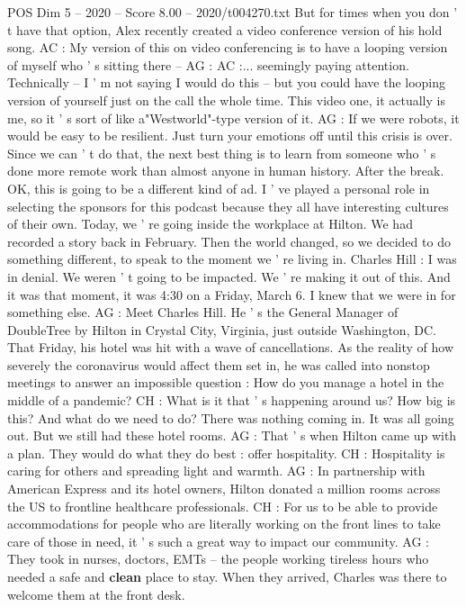 \begin{textsample}{POS Dim 5 – 2020 – Score 8.00 – 2020/t004270.txt}
But for times when you don ' t have that option, Alex recently created a video conference version of his hold song.
AC : My version of this on video conferencing is to have a looping version of myself who ' s sitting there -- AG : AC :... seemingly paying attention.
Technically -- I ' m not saying I would do this -- but you could have the looping version of yourself just on the call the whole time.
This video one, it actually is me, so it ' s sort of like a"Westworld"-type version of it.
AG : If we were robots, it would be easy to be resilient.
Just turn your emotions off until this crisis is over.
Since we can ' t do that, the next best thing is to learn from someone who ' s done more remote work than almost anyone in human history.
After the break.
OK, this is going to be a different kind of ad.
I ' ve played a personal role in selecting the sponsors for this podcast because they all have interesting cultures of their own.
Today, we ' re going inside the workplace at Hilton.
We had recorded a story back in February.
Then the world changed, so we decided to do something different, to speak to the moment we ' re living in.
Charles Hill : I was in denial.
We weren ' t going to be impacted.
We ' re making it out of this.
And it was that moment, it was 4:30 on a Friday, March 6.
I knew that we were in for something else.
AG : Meet Charles Hill.
He ' s the General Manager of DoubleTree by Hilton in Crystal City, Virginia, just outside Washington, DC.
That Friday, his hotel was hit with a wave of cancellations.
As the reality of how severely the coronavirus would affect them set in, he was called into nonstop meetings to answer an impossible question : How do you manage a hotel in the middle of a pandemic?
CH : What is it that ' s happening around us?
How big is this?
And what do we need to do?
There was nothing coming in.
It was all going out.
But we still had these hotel rooms.
AG : That ' s when Hilton came up with a plan.
They would do what they do best : offer hospitality.
CH : Hospitality is caring for others and spreading light and warmth.
AG : In partnership with American Express and its hotel owners, Hilton donated a million rooms across the US to frontline healthcare professionals.
CH : For us to be able to provide accommodations for people who are literally working on the front lines to take care of those in need, it ' s such a great way to impact our community.
AG : They took in nurses, doctors, EMTs -- the people working tireless hours who needed a safe and \textbf{clean} place to stay.
When they arrived, Charles was there to welcome them at the front desk.

\end{textsample}
